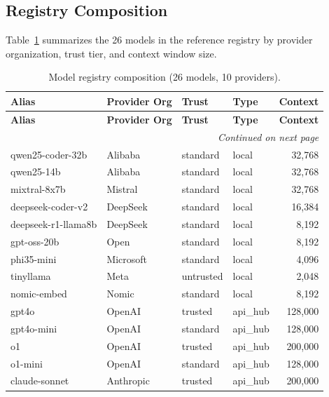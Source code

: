 \documentclass[11pt,a4paper]{article}
\theoremstyle{plain}
\theoremstyle{definition}
\begin{document}
\subsection{Registry Composition}

Table~\ref{tab:registry} summarizes the 26 models in the reference registry by
provider organization, trust tier, and context window size.

\begin{longtable}{llllr}
\caption{Model registry composition (26 models, 10 providers).}
\label{tab:registry}\\
\toprule
\textbf{Alias} & \textbf{Provider Org} & \textbf{Trust} & \textbf{Type} & \textbf{Context} \\
\midrule
\endfirsthead
\toprule
\textbf{Alias} & \textbf{Provider Org} & \textbf{Trust} & \textbf{Type} & \textbf{Context} \\
\midrule
\endhead
\midrule
\multicolumn{5}{r}{\emph{Continued on next page}} \\
\endfoot
\bottomrule
\endlastfoot
qwen25-coder-32b   & Alibaba   & standard  & local    & 32,768    \\
qwen25-14b         & Alibaba   & standard  & local    & 32,768    \\
mixtral-8x7b       & Mistral   & standard  & local    & 32,768    \\
deepseek-coder-v2  & DeepSeek  & standard  & local    & 16,384    \\
deepseek-r1-llama8b& DeepSeek  & standard  & local    & 8,192     \\
gpt-oss-20b        & Open      & standard  & local    & 8,192     \\
phi35-mini         & Microsoft & standard  & local    & 4,096     \\
tinyllama          & Meta      & untrusted & local    & 2,048     \\
nomic-embed        & Nomic     & standard  & local    & 8,192     \\
\midrule
gpt4o              & OpenAI    & trusted   & api\_hub & 128,000   \\
gpt4o-mini         & OpenAI    & standard  & api\_hub & 128,000   \\
o1                 & OpenAI    & trusted   & api\_hub & 200,000   \\
o1-mini            & OpenAI    & standard  & api\_hub & 128,000   \\
claude-sonnet      & Anthropic & trusted   & api\_hub & 200,000   \\

\end{longtable}
\end{document}
